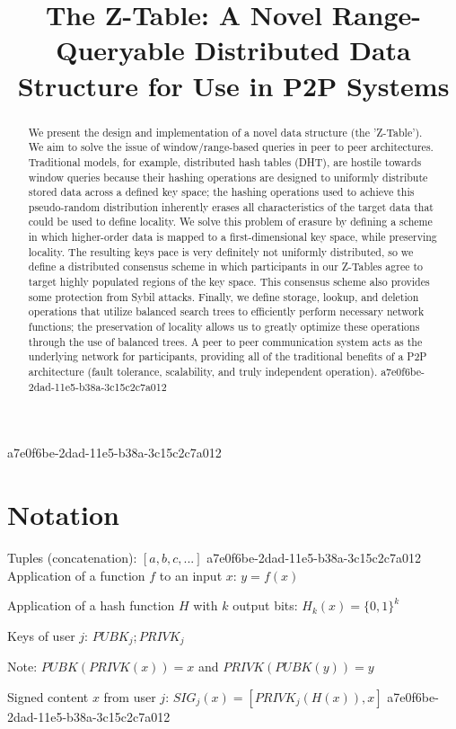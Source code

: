 \documentclass[12pt]{article}
\title{The Z-Table: A Novel Range-Queryable Distributed Data Structure for Use in P2P Systems}
\begin{document}
\maketitle
a7e0f6be-2dad-11e5-b38a-3c15c2c7a012
\begin{abstract}
We present the design and implementation of a novel data structure (the 'Z-Table'). We aim to solve the issue of window/range-based queries in peer to peer architectures. Traditional models, for example,  distributed hash tables (DHT), are hostile towards window queries because their hashing operations are designed to uniformly distribute stored data across a defined key space; the hashing operations used to achieve this pseudo-random distribution inherently erases all characteristics of the target data that could be used to define locality. We solve this problem of erasure by defining a scheme in which higher-order data is mapped to a first-dimensional key space, while preserving locality. The resulting keys pace is very definitely not uniformly distributed, so we define a distributed consensus scheme in which participants in our Z-Tables agree to target highly populated regions of the key space. This consensus scheme also provides some protection from Sybil attacks. Finally, we define storage, lookup, and deletion operations that utilize balanced search trees to efficiently perform necessary network functions; the preservation of locality allows us to greatly optimize these operations through the use of balanced trees. A peer to peer communication system acts as the underlying network for participants, providing all of the traditional benefits of a P2P architecture (fault tolerance, scalability, and truly independent operation).
a7e0f6be-2dad-11e5-b38a-3c15c2c7a012\end{abstract}

\section{Notation}

Tuples (concatenation): $[a,b,c,...]$
a7e0f6be-2dad-11e5-b38a-3c15c2c7a012
Application of a function $f$ to an input $x$: $y=f(x)$

Application of a hash function $H$ with $k$ output bits: $H_{k}(x) = \{0,1\}^k$

Keys of user $j$: $ PUBK_j; PRIVK_j $

Note: $PUBK(PRIVK(x)) = x$ and $PRIVK(PUBK(y)) = y$~

Signed content $x$ from user $j$: $SIG_j(x) = \left[ PRIVK_j( H(x) ), x \right]$
a7e0f6be-2dad-11e5-b38a-3c15c2c7a012
\end{document}
